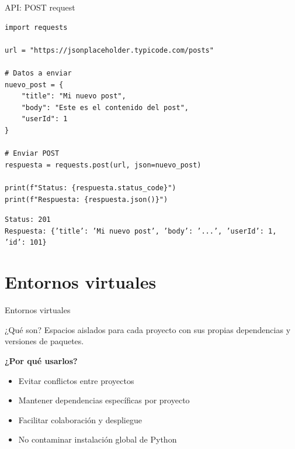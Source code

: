\documentclass{beamer}
\begin{document}
\begin{frame}[fragile]{API: POST request \faUpload}
\begin{lstlisting}
import requests

url = "https://jsonplaceholder.typicode.com/posts"

# Datos a enviar
nuevo_post = {
    "title": "Mi nuevo post",
    "body": "Este es el contenido del post",
    "userId": 1
}

# Enviar POST
respuesta = requests.post(url, json=nuevo_post)

print(f"Status: {respuesta.status_code}")
print(f"Respuesta: {respuesta.json()}")
\end{lstlisting}

\vspace{-0.2cm}
\begin{tcolorbox}[colback=green!10,colframe=green,title={\small\faArrowCircleRight \ Salida},coltitle=fg0,left=3pt,right=3pt,top=2pt,bottom=2pt,boxsep=1pt]
\tiny\texttt{Status: 201\\
Respuesta: \{'title': 'Mi nuevo post', 'body': '...', 'userId': 1, 'id': 101\}}
\end{tcolorbox}
\end{frame}

\section{Entornos virtuales}

\begin{frame}[fragile]{Entornos virtuales \faBox}
\begin{conceptbox}{¿Qué son?}
Espacios aislados para cada proyecto con sus propias dependencias y versiones de paquetes.
\end{conceptbox}

\textbf{¿Por qué usarlos?}
\small
\begin{itemize}
    \item[\faCheckCircle] Evitar conflictos entre proyectos
    \item[\faCheckCircle] Mantener dependencias específicas por proyecto
    \item[\faCheckCircle] Facilitar colaboración y despliegue
    \item[\faCheckCircle] No contaminar instalación global de Python
\end{itemize}
\end{frame}
\end{document}
